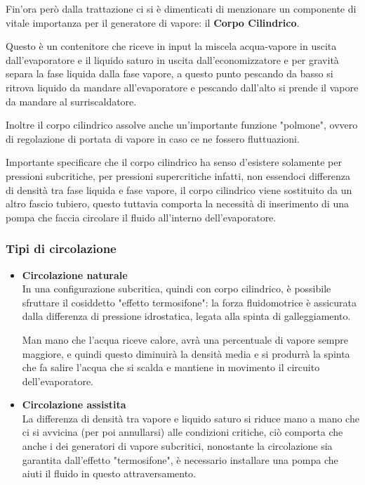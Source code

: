 \begin{adjustwidth}{2in}{}
			Fin'ora però dalla trattazione ci si è dimenticati di menzionare un componente di vitale importanza per il generatore di vapore: il \textbf{Corpo Cilindrico}. 
			
			Questo è un contenitore che riceve in input la miscela acqua-vapore in uscita dall'evaporatore e il liquido saturo in uscita dall'economizzatore e per gravità separa la fase liquida dalla fase vapore, a questo punto pescando da basso si ritrova liquido da mandare all'evaporatore e pescando dall'alto si prende il vapore da mandare al surriscaldatore.
			
			Inoltre il corpo cilindrico assolve anche un'importante funzione "polmone", ovvero di regolazione di portata di vapore in caso ce ne fossero fluttuazioni. \newline
			
			Importante specificare che il corpo cilindrico ha senso d'esistere solamente per pressioni subcritiche, per pressioni supercritiche infatti, non essendoci differenza di densità tra fase liquida e fase vapore, il corpo cilindrico viene sostituito da un altro fascio tubiero, questo tuttavia  comporta la necessità di inserimento di una pompa che faccia circolare il fluido all'interno dell'evaporatore. 
			
			\subsubsection{Tipi di circolazione}
			\begin{itemize}
				\item \textbf{Circolazione naturale}\\
				In una configurazione subcritica, quindi con corpo cilindrico, è possibile sfruttare il cosiddetto "effetto termosifone": la  forza  fluidomotrice è assicurata  dalla  differenza  di pressione  idrostatica,  legata  alla spinta di galleggiamento. 
				
				Man mano che l'acqua riceve calore, avrà una percentuale di vapore sempre maggiore, e quindi questo diminuirà  la densità media e si produrrà la spinta che  fa salire l'acqua che si scalda e mantiene in movimento il circuito dell'evaporatore. 
				
				\item \textbf{Circolazione assistita}\\
				La differenza di densità tra vapore e liquido saturo si riduce mano a mano che ci si avvicina (per poi annullarsi) alle condizioni critiche, ciò comporta che anche i dei generatori di vapore subcritici, nonostante la circolazione sia garantita dall'effetto "termosifone", è necessario installare una pompa che aiuti il fluido in questo attraversamento. 
				

\end{itemize}
\end{adjustwidth}

